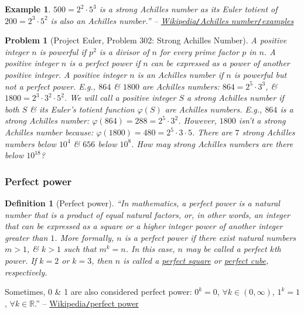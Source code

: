 \documentclass{article}
\newtheorem{definition}{Definition}
\newtheorem{example}{Example}
\newtheorem{problem}{Problem}
\begin{document}
\begin{example}
	$500 = 2^2\cdot5^3$ is a strong Achilles number as its Euler totient of $200 = 2^3\cdot5^2$ is also an Achilles number.'' -- \href{https://en.wikipedia.org/wiki/Achilles_number#Examples}{Wikipedia\emph{\texttt{/}}Achilles number\emph{\texttt{/}}examples}
\end{example}

\begin{problem}[Project Euler, Problem 302: Strong Achilles Number]
	A positive integer $n$ is \emph{powerful} if $p^2$ is a divisor of $n$ for every prime factor $p$ in $n$. A positive integer $n$ is a \emph{perfect power} if $n$ can be expressed as a power of another positive integer. A positive integer $n$ is an \emph{Achilles number} if $n$ is powerful but not a perfect power. E.g., $864$ \& $1800$ are Achilles numbers: $864 = 2^5\cdot3^3$, \& $1800 = 2^3\cdot3^2\cdot5^2$. We will call a positive integer $S$ a \emph{strong Achilles number} if both $S$ \& its Euler's totient function $\varphi(S)$ are Achilles numbers. E.g., $864$ is a strong Achilles number: $\varphi(864) = 288 = 2^5\cdot3^2$. However, $1800$ isn't a strong Achilles number because: $\varphi(1800) = 480 = 2^5\cdot3\cdot5$. There are $7$ strong Achilles numbers below $10^4$ \& $656$ below $10^8$. How may strong Achilles numbers are there below $10^{18}$?
\end{problem}

\subsubsection{Perfect power}

\begin{definition}[Perfect power]
	``In mathematics, a \emph{perfect power} is a natural number that is a product of equal natural factors, or, in other words, an integer that can be expressed as a square or a higher integer power of another integer greater than $1$. More formally, $n$ is a \emph{perfect power} if there exist natural numbers $m > 1$, \& $k > 1$ such that $m^k = n$. In this case, $n$ may be called a \emph{perfect $k$th power}. If $k = 2$ or $k = 3$, then $n$ is called a \href{https://en.wikipedia.org/wiki/Square_number}{perfect square} or \href{https://en.wikipedia.org/wiki/Perfect_cube}{perfect cube}, respectively.
\end{definition}
Sometimes, 0 \& 1 are also considered perfect power: $0^k = 0$, $\forall k\in(0,\infty)$, $1^k = 1$, $\forall k\in\mathbb{R}$.'' -- \href{https://en.wikipedia.org/wiki/Perfect_power}{Wikipedia\texttt{/}perfect power}
\end{document}
